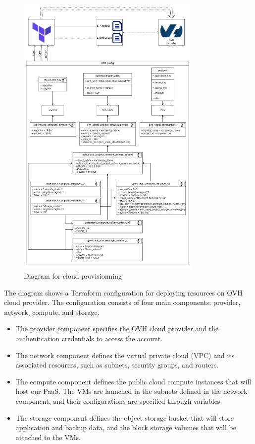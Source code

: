 \begin{figure}[H]\centering
\includegraphics[width=0.8\textwidth]{assets/f14.png}
\caption{Diagram for cloud provisionning}
\label{fig:fig14}
\end{figure}
\newpage
The diagram shows a Terraform configuration for deploying resources on OVH cloud provider. The configuration consists of four main components: provider, network, compute, and storage. 

\begin{itemize}[label={--}]
\item The provider component specifies the OVH cloud provider and the authentication credentials to access the account. 
\item The network component defines the virtual private cloud (VPC) and its associated resources, such as subnets, security groups, and routers. 
\item The compute component defines the public cloud compute instances that will host our PaaS. The VMs are launched in the subnets defined in the network component, and their configurations are specified through variables. 
\item The storage component defines the object storage bucket that will store application and backup data, and the block storage volumes that will be attached to the VMs. 
\end{itemize}

